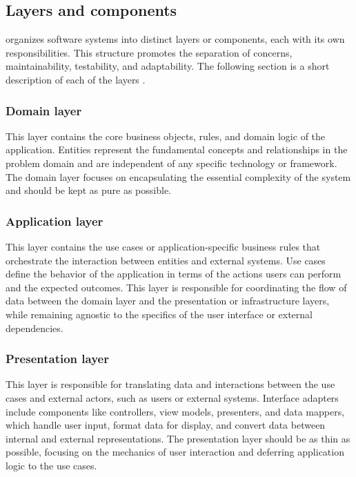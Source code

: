 \subsection{Layers and components} \label{subsec_layers}

\ca organizes software systems into distinct layers or components, each
with its own responsibilities. This structure promotes the separation of concerns,
maintainability, testability, and adaptability. The following section is a short
description of each of the layers \parencite{robert_c_martin_clean_2018}.

\subsubsection{Domain layer}
This layer contains the core business objects, rules, and domain logic of the application.
Entities represent the fundamental concepts and relationships in the problem domain and
are independent of any specific technology or framework. The domain layer focuses on
encapsulating the essential complexity of the system and should be kept as pure as
possible.

\subsubsection{Application layer}
This layer contains the use cases or application-specific
business rules that orchestrate the interaction between entities and external systems. Use
cases define the behavior of the application in terms of the actions users can perform and
the expected outcomes. This layer is responsible for coordinating the flow of data between
the domain layer and the presentation or infrastructure layers, while remaining agnostic
to the specifics of the user interface or external dependencies.

\subsubsection{Presentation layer}
This layer is responsible for translating data and interactions between the use cases and
external actors, such as users or external systems. Interface adapters include components
like controllers, view models, presenters, and data mappers, which handle user input,
format data for display, and convert data between internal and external representations.
The presentation layer should be as thin as possible, focusing on the mechanics of user
interaction and deferring application logic to the use cases.

